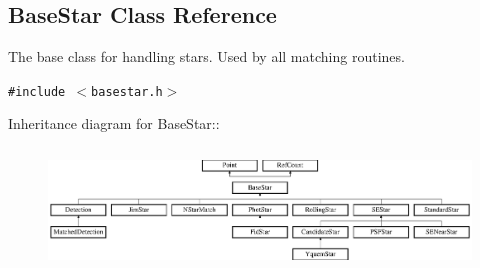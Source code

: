 \subsection{Base\-Star  Class Reference}
\label{class_basestar}
The base class for handling stars. Used by all matching routines. 


{\tt \#include $<$basestar.h$>$}

Inheritance diagram for Base\-Star::\begin{figure}[H]
\begin{center}
\leavevmode
\includegraphics[height=3.27869cm]{class_basestar}
\end{center}
\end{figure}
